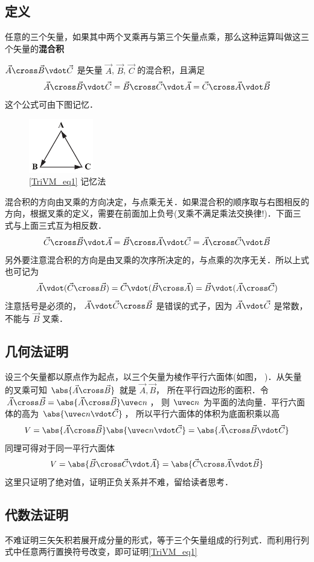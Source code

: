 
\subsection{定义}

任意的三个矢量，如果其中两个叉乘再与第三个矢量点乘，那么这种运算叫做这三个矢量的\textbf{混合积}

$\vec A \cross \vec B \vdot \vec C$ 是矢量 $\vec A$, $\vec B$, $\vec C$ 的混合积，且满足
\begin{equation}\label{TriVM_eq1}
\vec A \cross \vec B \vdot \vec C = \vec B \cross \vec C \vdot \vec A = \vec C \cross \vec A \vdot \vec B 
\end{equation} 
这个公式可由下图记忆．
\begin{figure}[ht]
\centering
\includegraphics[width=0.25\textwidth]{./figures/TriVM.pdf}
\caption{\autoref{TriVM_eq1} 记忆法}
\end{figure}
混合积的方向由叉乘的方向决定，与点乘无关．如果混合积的顺序取与右图相反的方向，根据叉乘的定义，需要在前面加上负号(叉乘不满足乘法交换律!)．下面三式与上面三式互为相反数．
\begin{equation}
\vec C \cross \vec B \vdot \vec A = \vec B \cross \vec A \vdot \vec C = \vec A \cross \vec C \vdot \vec B
\end{equation} 
另外要注意混合积的方向是由叉乘的次序所决定的，与点乘的次序无关．所以上式也可记为
 \begin{equation}
\vec A \vdot (\vec C \cross \vec B) = \vec C \vdot (\vec B \cross \vec A) = \vec B \vdot (\vec A \cross \vec C)
\end{equation} 
注意括号是必须的， $\vec A \vdot \vec C \cross \vec B$ 是错误的式子，因为 $\vec A \vdot \vec C$ 是常数，不能与 $\vec B$ 叉乘．


\subsection{几何法证明}

设三个矢量都以原点作为起点，以三个矢量为棱作平行六面体(如图，%
)．从矢量的叉乘可知 $\abs{\vec A \cross \vec B}$ 就是 $\vec A,\vec B$，  所在平行四边形的面积．令 $\vec A \cross \vec B = \abs{\vec A \cross \vec B} \uvec n$， 则 $\uvec n$ 为平面的法向量．平行六面体的高为 $\abs{\uvec n \vdot \vec C}$， 所以平行六面体的体积为底面积乘以高
\begin{equation}
V = \abs{\vec A \cross \vec B} \abs{\uvec n \vdot \vec C} = \abs{\vec A \cross \vec B \vdot \vec C}
\end{equation}
同理可得对于同一平行六面体
\begin{equation}
V = \abs{\vec B \cross \vec C \vdot \vec A} = \abs{\vec C \cross \vec A \vdot \vec B} 
\end{equation}  
这里只证明了绝对值，证明正负关系并不难，留给读者思考．

\subsection{代数法证明}
不难证明三矢矢积若展开成分量的形式，等于三个矢量组成的行列式．而利用行列式中任意两行置换符号改变，即可证明\autoref{TriVM_eq1}


